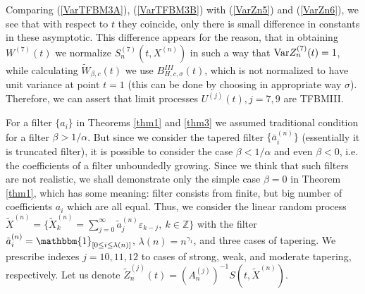 \documentclass[12pt]{article}
\def\bz{{\bf Z}}
\def\bz{{\mathbb Z}} %
\def\a{\alpha}
\def\b{\beta}
\def\e{\varepsilon}
\def\g{\gamma}
\def\l{\lambda}
\def\s{\sigma}
\newcommand{\ind}[1]{\mathbbm{1}_{#1}}
\theoremstyle{plain}
\theoremstyle{definition}
\begin{document}
 Comparing (\ref{VarTFBM3A}), (\ref{VarTFBM3B}) with (\ref{VarZn5}) and (\ref{VarZn6}), we  see that with respect to $t$  they coincide, only there is small difference in constants in these asymptotic.  This difference appears for the reason, that in obtaining $W^{(7)}(t)$ we normalize $S_n^{(7)}(t, X^{(n)})$ in such a way that ${\rm Var}Z_n^{(7)}(t)=1$, while calculating ${\tilde W}_{\b,c}(t)$ we use
$B_{H, c, \s}^{III}(t)$, which is not normalized to have unit variance at point $t=1$ (this can be done by choosing in appropriate way $\s$). Therefore, we can assert that limit processes $U^{(j)}(t), j=7, 9$ are  TFBMIII.












 For a filter $\{a_i\}$ in Theorems \ref{thm1} and \ref{thm3}  we assumed traditional condition for a filter $\b>1/\a$. But since we consider the tapered filter $\{{\bar a}_i^{(n)}\}$ (essentially it is truncated filter), it is possible to consider the case $\b<1/\a$ and even $\b<0$, i.e. the coefficients of a filter unboundedly growing. Since we think that such filters are not realistic, we shall demonstrate only the simple case $\b=0$ in Theorem \ref{thm1}, which has some meaning: filter consists from finite, but big number of coefficients $a_i$ which are  all equal.
 Thus, we consider the linear random process ${\tilde X}^{(n)}=\{ {\tilde X}_{k}^{(n)}=\sum_{j=0}^{\infty} {\tilde a}_{j}^{(n)}\e_{k-j}, \ k\in \bz\}$ with the filter  ${\tilde a}_i^{(n)}=\ind{[0\le i\le \l(n)]}$,  $\l(n)=n^{\g_1}$, and three cases of tapering.
 We prescribe indexes $j=10, 11, 12$ to  cases of strong, weak, and moderate  tapering, respectively. Let us denote ${\tilde Z}_n^{(j)}(t)= \left ( A_n^{(j)}\right )^{-1} S(t,{\tilde X}^{(n)})$.
\end{document}
